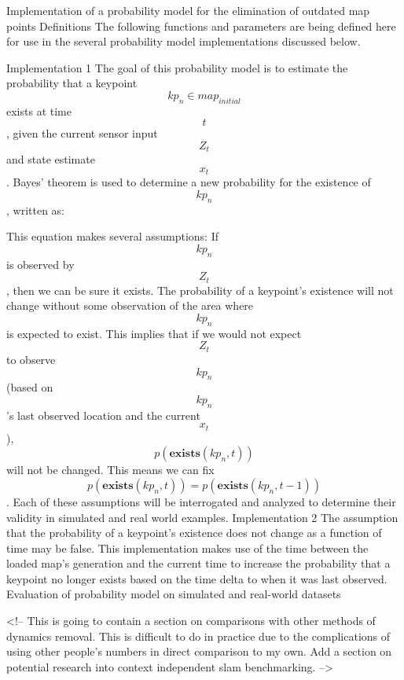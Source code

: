 \documentclass[12pt]{article}
\begin{document}
Implementation of a probability model for the elimination of outdated map points
Definitions
The following functions and parameters are being defined here for use in the several probability model implementations discussed below.


Implementation 1
The goal of this probability model is to estimate the probability that a keypoint $$kp_n\in map_{initial}$$ exists at time $$t$$, given the current sensor input $$Z_t$$ and state estimate $$x_t$$. Bayes’ theorem is used to determine a new probability for the existence of $$kp_n$$, written as:


This equation makes several assumptions:
If $$kp_n$$ is observed by $$Z_t$$, then we can be sure it exists.
The probability of a keypoint’s existence will not change without some observation of the area where $$kp_n$$ is expected to exist. This implies that if we would not expect $$Z_t$$ to observe $$kp_n$$ (based on $$kp_n$$’s last observed location and the current $$x_t$$), $$p(\mathbf{exists}(kp_n,t))$$ will not be changed. This means we can fix $$p(\mathbf{exists}(kp_n,t))=p(\mathbf{exists}(kp_n,t-1))$$.
Each of these assumptions will be interrogated and analyzed to determine their validity in simulated and real world examples.
Implementation 2
The assumption that the probability of a keypoint’s existence does not change as a function of time may be false. This implementation makes use of the time between the loaded map’s generation and the current time to increase the probability that a keypoint no longer exists based on the time delta to when it was last observed.
Evaluation of probability model on simulated and real-world datasets

<!-- This is going to contain a section on comparisons with other methods of dynamics removal.
This is difficult to do in practice due to the complications of using other people's numbers
in direct comparison to my own. Add a section on potential research into context independent
slam benchmarking. -->
\end{document}

